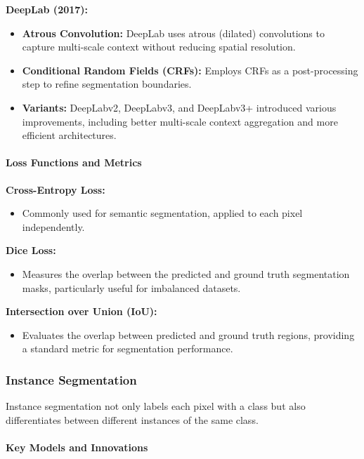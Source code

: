 \documentclass[12pt]{article}
\begin{document}
\textbf{DeepLab (2017):}
\begin{itemize}
    \item \textbf{Atrous Convolution:} DeepLab uses atrous (dilated) convolutions to capture multi-scale context without reducing spatial resolution.
    \item \textbf{Conditional Random Fields (CRFs):} Employs CRFs as a post-processing step to refine segmentation boundaries.
    \item \textbf{Variants:} DeepLabv2, DeepLabv3, and DeepLabv3+ introduced various improvements, including better multi-scale context aggregation and more efficient architectures.
\end{itemize}

\paragraph{Loss Functions and Metrics}

\textbf{Cross-Entropy Loss:}
\begin{itemize}
    \item Commonly used for semantic segmentation, applied to each pixel independently.
\end{itemize}

\textbf{Dice Loss:}
\begin{itemize}
    \item Measures the overlap between the predicted and ground truth segmentation masks, particularly useful for imbalanced datasets.
\end{itemize}

\textbf{Intersection over Union (IoU):}
\begin{itemize}
    \item Evaluates the overlap between predicted and ground truth regions, providing a standard metric for segmentation performance.
\end{itemize}

\subsubsection{Instance Segmentation}

Instance segmentation not only labels each pixel with a class but also differentiates between different instances of the same class.

\paragraph{Key Models and Innovations}
\end{document}
